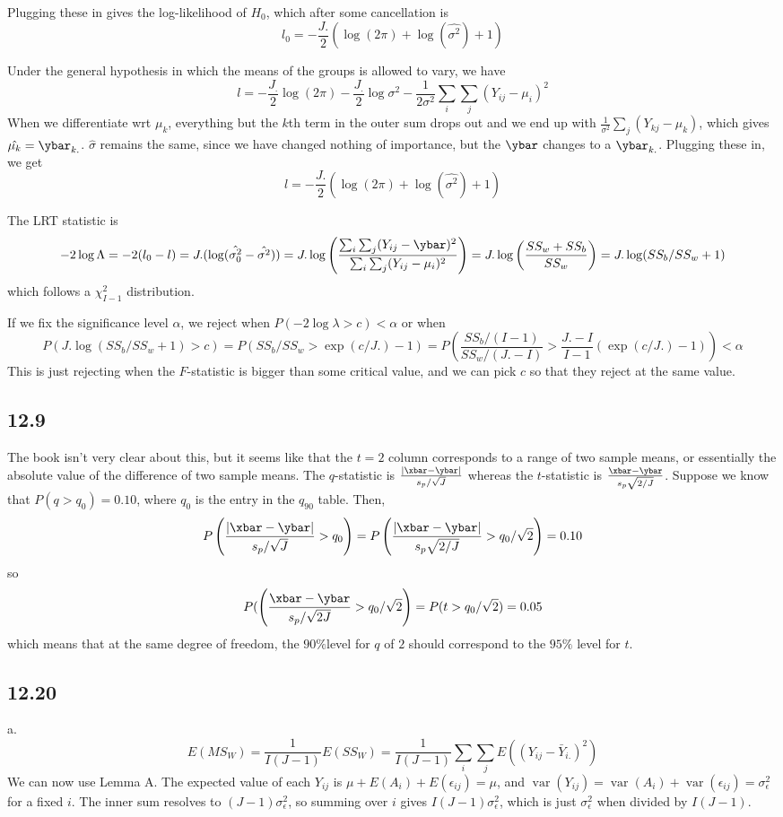 \documentclass{article}
\newcommand{\ep}{\epsilon}
\DeclareMathOperator{\var}{var}
\begin{document}
Plugging these in gives the log-likelihood of $H_0$, which after some cancellation is 
$$l_0=-\frac{J.}{2}(\log(2\pi)+\log(\hat{\sigma^2})+1)$$

Under the general hypothesis in which the means of the groups is allowed to vary, we have 
$$l=-\frac{J_.}{2}\log(2\pi)-\frac{J_.}{2}\log\sigma^2-\frac{1}{2\sigma^2}\sum_i\sum_j(Y_{ij}-\mu_i)^2$$
When we differentiate wrt $\mu_k$, everything but the $k$th term in the outer sum drops out and we end up with $\frac{1}{\sigma^2}\sum_j(Y_{kj}-\mu_k)$, which gives $\hat{\mu_k}=\ybar_{k.}$. $\hat{\sigma}$ remains the same, since we have changed nothing of importance, but the $\ybar$ changes to a $\ybar_{k.}$. Plugging these in, we get 
$$l=-\frac{J.}{2}(\log(2\pi)+\log(\hat{\sigma^2})+1)$$

The LRT statistic is 
$$-2\log\Lambda=-2(l_0-l)=J.(\log(\hat{\sigma^2_0}-\hat{\sigma^2}))=J.\log\left(\frac{\sum_i\sum_j(Y_{ij}-\ybar)^2}{\sum_i\sum_j(Y_{ij}-\mu_i)^2}\right)=J.\log\left(\frac{SS_w+SS_b}{SS_w}\right)=J.\log(SS_b/SS_w+1)$$
which follows a $\chi^2_{I-1}$ distribution. 

If we fix the significance level $\alpha$, we reject when $P(-2\log\lambda>c)<\alpha$ or when 
$$P(J.\log(SS_b/SS_w+1)>c)=P(SS_b/SS_w>\exp(c/J.)-1)=P\left(\frac{SS_b/(I-1)}{SS_w/(J.-I)}>\frac{J.-I}{I-1}(\exp(c/J.)-1)\right)<\alpha$$
This is just rejecting when the $F$-statistic is bigger than some critical value, and we can pick $c$ so that they reject at the same value.
\subsection*{12.9}
The book isn't very clear about this, but it seems like that the $t=2$ column corresponds to a range of two sample means, or essentially the absolute value of the difference of two sample means. The $q$-statistic is $\frac{|\xbar-\ybar|}{s_p/\sqrt{J}}$ whereas the $t$-statistic is $\frac{\xbar-\ybar}{s_p\sqrt{2/J}}$. Suppose we know that $P(q>q_0)=0.10$, where $q_0$ is the entry in the $q_{90}$ table. Then, 
$$P\left(\frac{|\xbar-\ybar|}{s_p/\sqrt{J}}>q_0\right)=P\left(\frac{|\xbar-\ybar|}{s_p\sqrt{2/J}}>q_0/\sqrt{2}\right)=0.10$$
so 
$$P(\left(\frac{\xbar-\ybar}{s_p/\sqrt{2J}}>q_0/\sqrt{2}\right)=P(t>q_0/\sqrt{2})=0.05$$
which means that at the same degree of freedom, the $90\%$level for $q$ of $2$ should correspond to the $95\%$ level for $t$.
\subsection*{12.20}
a. $$E(MS_W)=\frac{1}{I(J-1)}E(SS_W)=\frac{1}{I(J-1)}\sum_i\sum_jE((Y_{ij}-\bar{Y}_{i.})^2)$$
We can now use Lemma A. The expected value of each $Y_{ij}$ is $\mu+E(A_i)+E(\ep_{ij})=\mu$, and $\var(Y_{ij})=\var(A_i)+\var(\ep_{ij})=\sigma_\ep^2$ for a fixed $i$. The inner sum resolves to $(J-1)\sigma_\ep^2$, so summing over $i$ gives $I(J-1)\sigma_\ep^2$, which is just $\sigma_\ep^2$ when divided by $I(J-1)$.
\end{document}
